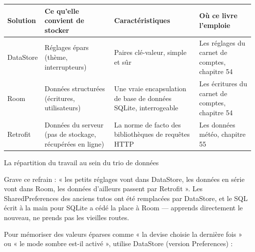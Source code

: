 


\begin{center}
\begin{tabularx}{\linewidth}{|X|X|X|X|}
\hline
\textbf{Solution} & \textbf{Ce qu'elle convient de stocker} & \textbf{Caractéristiques} & \textbf{Où ce livre l'emploie} \tabularnewline
\hline
DataStore & Réglages épars (thème, interrupteurs) & Paires clé-valeur, simple et sûr & Les réglages du carnet de comptes, chapitre 54 \tabularnewline
Room & Données structurées (écritures, utilisateurs) & Une vraie encapsulation de base de données SQLite, interrogeable & Les écritures du carnet de comptes, chapitre 54 \tabularnewline
Retrofit & Données du serveur (pas de stockage, récupérées en ligne) & La norme de facto des bibliothèques de requêtes HTTP & Les données météo, chapitre 55 \tabularnewline
\hline
\end{tabularx}
\end{center}

\begin{center}\small\color{gray}La répartition du travail au sein du trio de données\end{center}

Grave ce refrain : « les petits réglages vont dans DataStore, les données en série vont dans Room, les données d'ailleurs passent par Retrofit ». Les SharedPreferences des anciens tutos ont été remplacées par DataStore, et le SQL écrit à la main pour SQLite a cédé la place à Room — apprends directement le nouveau, ne prends pas les vieilles routes.


Pour mémoriser des valeurs éparses comme « la devise choisie la dernière fois » ou « le mode sombre est-il activé », utilise DataStore (version Preferences) :

